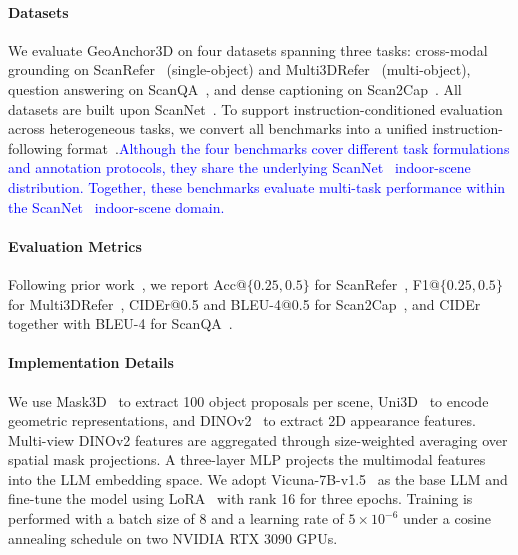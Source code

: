 \documentclass[lettersize,journal]{IEEEtran}
\begin{document}
\paragraph*{Datasets} We evaluate GeoAnchor3D on four datasets spanning three tasks: cross-modal grounding on ScanRefer~\cite{scanrefer2020} (single-object) and Multi3DRefer~\cite{multi3drefer2023} (multi-object), question answering on ScanQA~\cite{scanqa2022}, and dense captioning on Scan2Cap~\cite{scan2cap2021}. All datasets are built upon ScanNet~\cite{scannet2017}. To support instruction-conditioned evaluation across heterogeneous tasks, we convert all benchmarks into a unified instruction-following format~\cite{chatscene2024}.\textcolor{blue}{Although the four benchmarks cover different task formulations and annotation protocols, they share the underlying ScanNet~\cite{scannet2017} indoor-scene distribution. Together, these benchmarks evaluate multi-task performance within the ScanNet~\cite{scannet2017} indoor-scene domain.}

\paragraph*{Evaluation Metrics} Following prior work~\cite{chatscene2024}, we report Acc@$\{0.25, 0.5\}$ for ScanRefer~\cite{scanrefer2020}, F1@$\{0.25, 0.5\}$ for Multi3DRefer~\cite{multi3drefer2023}, CIDEr@0.5 and BLEU-4@0.5 for Scan2Cap~\cite{scan2cap2021}, and CIDEr together with BLEU-4 for ScanQA~\cite{scanqa2022}.

\paragraph*{Implementation Details} We use Mask3D~\cite{mask3d2023} to extract 100 object proposals per scene, Uni3D~\cite{uni3d2024} to encode geometric representations, and DINOv2~\cite{dinov22023} to extract 2D appearance features. Multi-view DINOv2 features are aggregated through size-weighted averaging over spatial mask projections. A three-layer MLP projects the multimodal features into the LLM embedding space. We adopt Vicuna-7B-v1.5~\cite{vicuna2023} as the base LLM and fine-tune the model using LoRA~\cite{lora2022} with rank 16 for three epochs. Training is performed with a batch size of 8 and a learning rate of $5 \times 10^{-6}$ under a cosine annealing schedule on two NVIDIA RTX 3090 GPUs.
\end{document}
